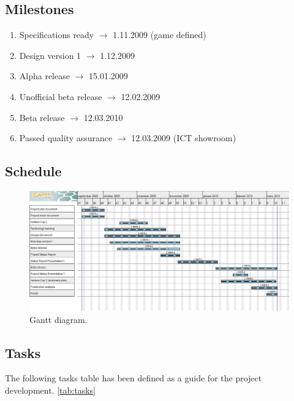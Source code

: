 \documentclass[12pt,a4paper]{article}
\begin{document}
\subsection{Milestones}

\begin{enumerate}
\item Specifications ready
	$\rightarrow$ 1.11.2009 (game defined)
\item Design version 1
	$\rightarrow$ 1.12.2009
\item Alpha release
	$\rightarrow$ 15.01.2009
\item Unofficial beta release
	$\rightarrow$ 12.02.2009 
\item Beta release
	$\rightarrow$ 12.03.2010
\item Passed quality assurance
	$\rightarrow$ 12.03.2009 (ICT  showroom)
\end{enumerate}

\subsection{Schedule}

\begin{figure}[h!]
\centering
\includegraphics[width=13cm]{pic/gantt.jpg}
\caption{Gantt diagram.}
\label{fig:ganttdia}
\end{figure}

\subsection{Tasks}

The following tasks table has been defined as a guide for the project development. \ref{tab:tasks}
\end{document}
